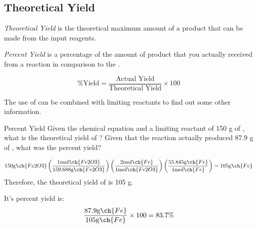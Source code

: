 \subsection{Theoretical Yield} \label{subsec:Theoretical Yield}
\begin{definition} \label{def:Theoretical Yield}
  \emph{Theoretical Yield} is the theoretical maximum amount of a product that can be made from the input reagents.
\end{definition}
\begin{definition} \label{def:Percent Yield}
  \emph{Percent Yield} is a percentage of the amount of product that you actually received from a reaction in comparison to the .

  \begin{equation} \label{eq:Percent Yield}
    \text{\% Yield} = \frac{\text{Actual Yield}}{\text{Theoretical Yield}} \times 100
  \end{equation}
  \begin{remark}
    The use of  can be combined with limiting reactants to find out some other information.
  \end{remark}
\end{definition}

\begin{example}[]{Percent Yield}
  Given the chemical equation  and a limiting reactant of 150 \si{\gram} of , what is the theoretical yield of ?
  Given that the reaction actually produced 87.9 \si{\gram} of , what was the percent yield?

  \tcblower

  \begin{equation*}
    150 \si{\gram} \ch{Fe2O3} \left( \frac{1 \si{\mole} \ch{Fe2O3}}{159.688 \si{\gram} \ch{Fe2O3}} \right) \left( \frac{2 \si{\mole} \ch{Fe}}{1 \si{\mole} \ch{Fe2O3}} \right) \left( \frac{55.845 \si{\gram} \ch{Fe}}{1 \si{\mole} \ch{Fe}} \right) = 105 \si{\gram} \ch{Fe}
  \end{equation*}
  Therefore, the theoretical yield of  is 105 \si{\gram}.

  It's percent yield is:
  \begin{equation*}
    \frac{87.9 \si{\gram} \ch{Fe}}{105 \si{\gram} \ch{Fe}} \times 100 = 83.7 \%
  \end{equation*}
\end{example}
